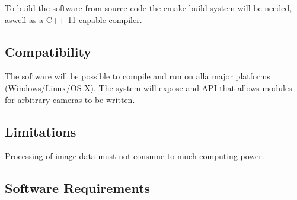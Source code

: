 To build the software from source code the cmake build system will be needed, aswell as a C++ 11 capable compiler.

\subsection{Compatibility}
The software will be possible to compile and run on alla major platforms (Windows/Linux/OS X). The system will expose and API that allows modules for arbitrary cameras to be written.

\subsection{Limitations}
Processing of image data must not consume to much computing power.

\subsection{Software Requirements}
\label{sec:software_req}
\reqtable
{	
}